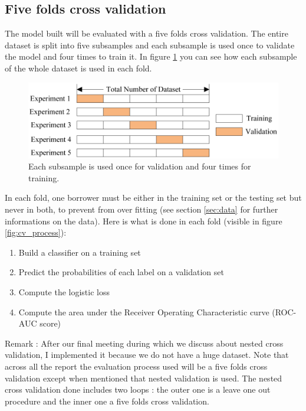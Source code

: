 	\subsection{Five folds cross validation}
		The model built will be evaluated with a five folds cross validation. The entire dataset is split into five subsamples and each subsample is used once to validate the model and four times to train it. In figure \ref{fig:5_fold_cv} you can see how each subsample of the whole dataset is used in each fold.

	\begin{figure}[h]
		\centering
		\includegraphics[width=\textwidth]{images/5_fold_cv.png}
		\caption{Each subsample is used once for validation and four times for training.}
		\label{fig:5_fold_cv}
	\end{figure}

	In each fold, one borrower must be either in the training set or the testing set but never in both, to prevent from over fitting (see section \ref{sec:data} for further informations on the data). Here is what is done in each fold (visible in figure \ref{fig:cv_process}):
	\begin{enumerate}
		\item Build a classifier on a training set
		\item Predict the probabilities of each label on a validation set
		\item Compute the logistic loss
		\item Compute the area under the Receiver Operating Characteristic curve (ROC-AUC score)
	\end{enumerate}
	Remark : After our final meeting during which we discuss about nested cross validation, I implemented it because we do not have a huge dataset. Note that across all the report the evaluation process used will be a five folds cross validation except when mentioned that nested validation is used. The nested cross validation done includes two loops : the outer one is a leave one out procedure and the inner one a five folds cross validation.

